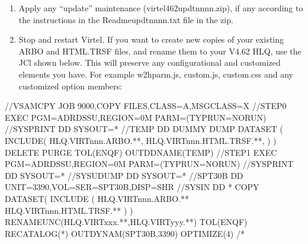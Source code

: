 \documentclass[letterpaper,10pt,english]{sphinxmanual}
\begin{document}
\newpage
\begin{enumerate}
%
\setcounter{enumi}{11}
\item {} 
\sphinxAtStartPar
Apply any “update” maintenance (virtel462updtnnnn.zip), if any according to the instructions in the Readme\sphinxhyphen{}updtnnnn.txt file in the zip.

\item {} 
\sphinxAtStartPar
Stop and restart Virtel. If you want to create new copies of your existing ARBO and HTML.TRSF files, and rename them to your V4.62 HLQ, use the JCl shown below. This will preserve any configurational and customized elements you have. For example w2hparm.js, custom.js, custom.css and any customized option members:\sphinxhyphen{}

\end{enumerate}

\begin{sphinxVerbatim}[commandchars=\\\{\}]
//\PYGZdl{}VSAMCPY JOB 9000,\PYGZsq{}COPY FILES\PYGZsq{},CLASS=A,MSGCLASS=X
//STEP0   EXEC PGM=ADRDSSU,REGION=0M PARM=(\PYGZsq{}TYPRUN=NORUN\PYGZsq{})
//SYSPRINT DD SYSOUT=*
//TEMP DD DUMMY
 DUMP DATASET              \PYGZhy{}
      (                    \PYGZhy{}
       INCLUDE(            \PYGZhy{}
      HLQ.VIRTnnn.ARBO.**, \PYGZhy{}
      HLQ.VIRTnnn.HTML.TRSF.**, \PYGZhy{}
                )         \PYGZhy{}
      )                   \PYGZhy{}
      DELETE    \PYGZhy{}
      PURGE      \PYGZhy{}
      TOL(ENQF) \PYGZhy{}
      OUTDDNAME(TEMP)
//STEP1   EXEC PGM=ADRDSSU,REGION=0M PARM=(\PYGZsq{}TYPRUN=NORUN\PYGZsq{})
//SYSPRINT DD  SYSOUT=*
//SYSUDUMP DD  SYSOUT=*
//SPT30B   DD  UNIT=3390,VOL=SER=SPT30B,DISP=SHR
//SYSIN    DD  *
 COPY                                             \PYGZhy{}
       DATASET(                                   \PYGZhy{}
       INCLUDE (                                  \PYGZhy{}
       HLQ.VIRTnnn.ARBO.**                    \PYGZhy{}
       HLQ.VIRTnnn.HTML.TRSF.**               \PYGZhy{}
  )                                               \PYGZhy{}
  )\PYGZhy{}
  RENAMEUNC(HLQ.VIRTxxx.**,HLQ.VIRTyyy.**) \PYGZhy{}
  TOL(ENQF)   \PYGZhy{}
  RECATALOG(*) \PYGZhy{}
  OUTDYNAM(SPT30B,3390) \PYGZhy{}
  OPTIMIZE(4)
/*
\end{sphinxVerbatim}

\sphinxAtStartPar
{}

\newpage
\end{document}

